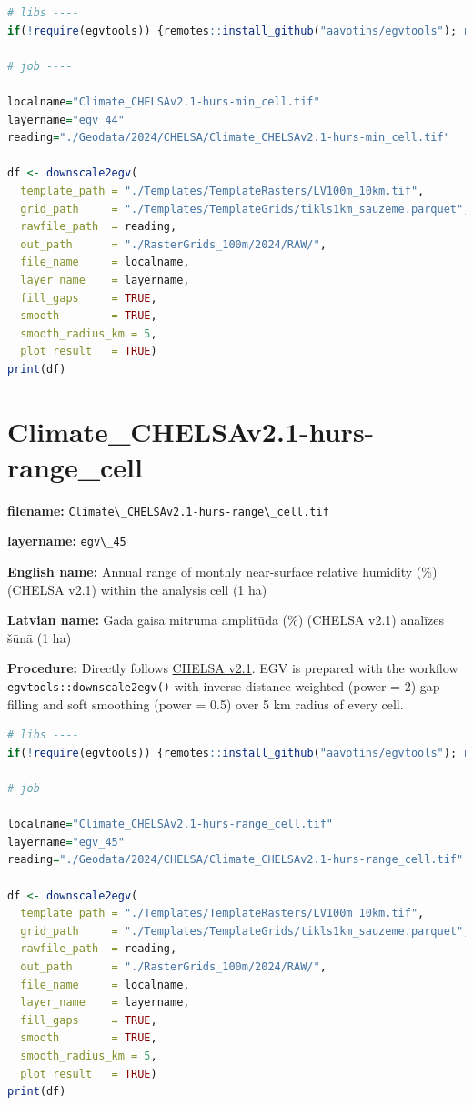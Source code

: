 \documentclass[
]{book}
\newcommand{\passthrough}[1]{#1}
\begin{document}
\begin{lstlisting}[language=R]
# libs ----
if(!require(egvtools)) {remotes::install_github("aavotins/egvtools"); require(egvtools)}

# job ----

localname="Climate_CHELSAv2.1-hurs-min_cell.tif"
layername="egv_44"
reading="./Geodata/2024/CHELSA/Climate_CHELSAv2.1-hurs-min_cell.tif"

df <- downscale2egv(
  template_path = "./Templates/TemplateRasters/LV100m_10km.tif",
  grid_path     = "./Templates/TemplateGrids/tikls1km_sauzeme.parquet",
  rawfile_path  = reading,
  out_path      = "./RasterGrids_100m/2024/RAW/",
  file_name     = localname,
  layer_name    = layername,
  fill_gaps     = TRUE,
  smooth        = TRUE,
  smooth_radius_km = 5,
  plot_result   = TRUE)
print(df)
\end{lstlisting}

\section{Climate\_CHELSAv2.1-hurs-range\_cell}\label{ch06.045}

\textbf{filename:} \passthrough{\lstinline!Climate\_CHELSAv2.1-hurs-range\_cell.tif!}

\textbf{layername:} \passthrough{\lstinline!egv\_45!}

\textbf{English name:} Annual range of monthly near-surface relative humidity (\%) (CHELSA v2.1) within the analysis cell (1 ha)

\textbf{Latvian name:} Gada gaisa mitruma amplitūda (\%) (CHELSA v2.1) analīzes šūnā (1 ha)

\textbf{Procedure:} Directly follows \hyperref[Ch04.11]{CHELSA v2.1}. EGV is prepared with the
workflow \passthrough{\lstinline!egvtools::downscale2egv()!} with inverse distance weighted (power = 2)
gap filling and soft smoothing (power = 0.5) over 5 km radius of every cell.

\begin{lstlisting}[language=R]
# libs ----
if(!require(egvtools)) {remotes::install_github("aavotins/egvtools"); require(egvtools)}

# job ----

localname="Climate_CHELSAv2.1-hurs-range_cell.tif"
layername="egv_45"
reading="./Geodata/2024/CHELSA/Climate_CHELSAv2.1-hurs-range_cell.tif"

df <- downscale2egv(
  template_path = "./Templates/TemplateRasters/LV100m_10km.tif",
  grid_path     = "./Templates/TemplateGrids/tikls1km_sauzeme.parquet",
  rawfile_path  = reading,
  out_path      = "./RasterGrids_100m/2024/RAW/",
  file_name     = localname,
  layer_name    = layername,
  fill_gaps     = TRUE,
  smooth        = TRUE,
  smooth_radius_km = 5,
  plot_result   = TRUE)
print(df)
\end{lstlisting}
\end{document}
